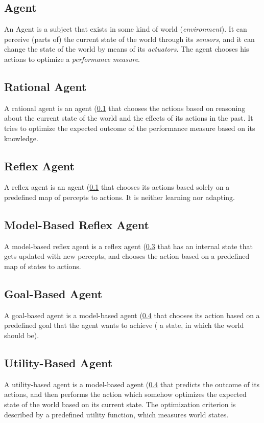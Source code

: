 \documentclass[11pt,a4paper]{scrartcl}
\begin{document}
\subsection{Agent}\label{s:agent}
An Agent is a subject that exists in some kind of world (\emph{environment}). It can perceive (parts of) the current state of the world through its \emph{sensors}, and it can change the state of the world by means of its \emph{actuators}. 
The agent chooses his actions to optimize a \emph{performance measure}. 

\subsection{Rational Agent}
A rational agent is an agent (\ref{s:agent} that chooses the actions based on reasoning about the current state of the world and the effects of its actions in the past. 
It tries to optimize the expected outcome of the performance measure based on its knowledge.

\subsection{Reflex Agent}\label{s:r-agent}
A reflex agent is an agent (\ref{s:agent} that chooses its actions based solely on a predefined map of percepts to actions. It is neither learning nor adapting. 

\subsection{Model-Based Reflex Agent}\label{s:mbr-agent}
A model-based reflex agent is a reflex agent (\ref{s:r-agent} that has an internal state that gets updated with new percepts, and chooses the action based on a predefined map of states to actions.

\subsection{Goal-Based Agent}\label{s:gb-agent}
A goal-based agent is a model-based agent (\ref{s:mbr-agent} that chooses its action based on a predefined goal that the agent wants to achieve ( a state, in which the world should be). 

\subsection{Utility-Based Agent}\label{s:ub-agent}
A utility-based agent is a model-based agent (\ref{s:mbr-agent} that predicts the outcome of its actions, and then performs the action which somehow optimizes the expected state of the world based on its current state. 
The optimization criterion is described by a predefined utility function, which measures world states.
\end{document}
